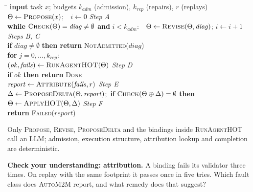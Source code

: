 \documentclass[10pt,a4paper]{article}
\newcommand{\auto}{\textsc{AutoM2M}}
\newcommand{\Team}{\Theta}
\newenvironment{think}[1][Check your understanding]{%
  \begin{tcolorbox}[enhanced, colback=thinkbg, colframe=thinkbg, arc=0pt, boxrule=0pt,
     borderline west={2.2pt}{0pt}{thinkbar}, left=8pt, right=8pt, top=5pt, bottom=5pt,
     before skip=8pt, after skip=8pt]
  \textsf{\bfseries\color{thinkbar}#1.}\enspace}{\end{tcolorbox}}
\begin{document}
\begin{center}
\begin{minipage}{0.92\linewidth}
\begin{tcolorbox}[enhanced, colback=white, colframe=black!25, arc=0pt, boxrule=0.5pt,
  left=6pt, right=6pt, top=4pt, bottom=4pt, title={\sffamily\small Algorithm 1: the \auto{} loop}, 
  coltitle=black, colbacktitle=black!6, fonttitle=\bfseries]
\small
\begin{tabbing}
\quad\=\quad\=\quad\=\kill
\textbf{input} task $x$; budgets $k_{\mathit{adm}}$ (admission), $k_{\mathit{rep}}$ (repairs), $r$ (replays)\\
$\Team \gets \textsc{Propose}(x)$;\ \ $i\gets 0$ \hfill \textit{Step A}\\
\textbf{while} $\textsc{Check}(\Team)=\mathit{diag}\neq\emptyset$ \textbf{and} $i<k_{\mathit{adm}}$:\ \ $\Team\gets\textsc{Revise}(\Team,\mathit{diag})$; $i\gets i+1$ \hfill \textit{Steps B, C}\\
\textbf{if} $\mathit{diag}\neq\emptyset$ \textbf{then return} \textsc{NotAdmitted}($\mathit{diag}$)\\
\textbf{for} $j=0,\dots,k_{\mathit{rep}}$:\\
\>$(\mathit{ok},\mathit{fails})\gets\textsc{RunAgentHOT}(\Team)$ \hfill \textit{Step D}\\
\>\textbf{if} $\mathit{ok}$ \textbf{then return} \textsc{Done}\\
\>$\mathit{report}\gets\textsc{Attribute}(\mathit{fails},r)$ \hfill \textit{Step E}\\
\>$\Delta\gets\textsc{ProposeDelta}(\Team,\mathit{report})$;\ \textbf{if} $\textsc{Check}(\Team\oplus\Delta)=\emptyset$ \textbf{then} $\Team\gets\textsc{ApplyHOT}(\Team,\Delta)$ \hfill \textit{Step F}\\
\textbf{return} \textsc{Failed}($\mathit{report}$)
\end{tabbing}
\end{tcolorbox}
\end{minipage}
\end{center}
\label{alg:auto}
{\small Only \textsc{Propose}, \textsc{Revise}, \textsc{ProposeDelta} and the
bindings inside \textsc{RunAgentHOT} call an LLM; admission, execution
structure, attribution lookup and completion are deterministic.}


\begin{think}[Check your understanding: attribution]
A binding fails its validator three times. On replay with the same
footprint it passes once in five tries. Which fault class does \auto{}
report, and what remedy does that suggest?
\end{think}
\end{document}
